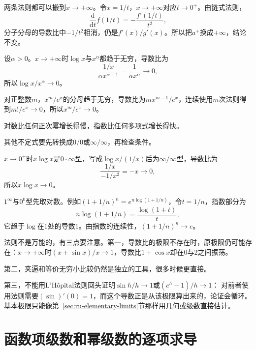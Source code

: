 两条法则都可以搬到$x\to+\infty$。令$x=1/t$，$x\to+\infty$对应$t\to0^+$。由链式法则，
\[
 \frac{\mathrm d}{\mathrm dt}f(1/t)=-\frac{f'(1/t)}{t^2},
\]
分子分母的导数比中$-1/t^2$相消，仍是$f'(x)/g'(x)$。所以把$a^+$换成$+\infty$，结论不变。
\begin{example}[对数、幂与指数的增长比较]
\label{ex:ru-growth-comparison}
设$\alpha>0$。$x\to+\infty$时$\log x$与$x^\alpha$都趋于无穷，导数比为
\[
 \frac{1/x}{\alpha x^{\alpha-1}}=\frac1{\alpha x^\alpha}\to0,
\]
所以$\log x/x^\alpha\to0$。

对正整数$m$，$x^m/e^x$的分母趋于无穷，导数比为$mx^{m-1}/e^x$，连续使用$m$次法则得到$m!/e^x\to0$，所以$x^m/e^x\to0$。

对数比任何正次幂增长得慢，指数比任何多项式增长得快。
\end{example}

其他不定式要先转换成$0/0$或$\infty/\infty$，再检查条件。
\begin{example}
\label{ex:ru-other-indeterminate-forms}
$x\to0^+$时$x\log x$是$0\cdot\infty$型，写成$\log x/(1/x)$后为$\infty/\infty$型，导数比为
\[
 \frac{1/x}{-1/x^2}=-x\to0,
\]
所以$x\log x\to0$。

$1^\infty$与$0^0$型先取对数。例如$(1+1/n)^n=e^{n\log(1+1/n)}$，令$t=1/n$，指数部分为
\[
 n\log(1+1/n)=\frac{\log(1+t)}t,
\]
它趋于$\log$在$1$处的导数$1$。由指数的连续性，$(1+1/n)^n\to e$。
\end{example}

法则不是万能的，有三点要注意。第一，导数比的极限不存在时，原极限仍可能存在：$x\to+\infty$时$(x+\sin x)/x\to1$，导数比$1+\cos x$却在$0$与$2$之间振荡。

第二，夹逼和等价无穷小比较仍然是独立的工具，很多时候更直接。

第三，不能用L'Hôpital法则回头证明$\sin h/h\to1$或$(e^h-1)/h\to1$：
对前者使用法则需要$(\sin)'(0)=1$，而这个导数正是从该极限算出来的，论证会循环。基本极限只能像第~\ref{sec:ru-elementary-limits}节那样用几何或级数直接估计。
\section{函数项级数和幂级数的逐项求导}
\label{sec:ru-termwise-differentiation}


